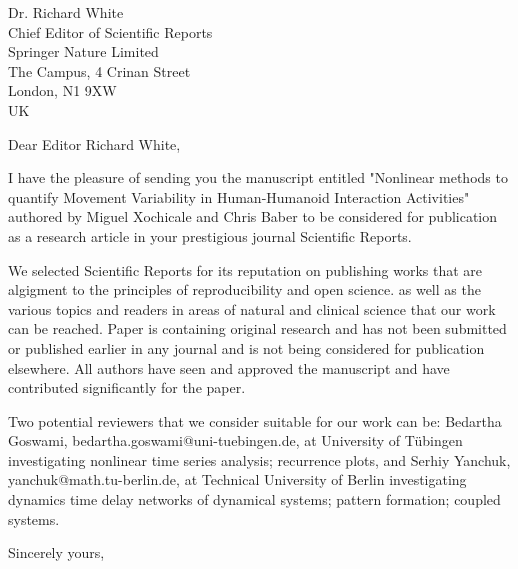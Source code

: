 \documentclass[10pt]{letter}
\begin{document}
\begin{letter}{Dr. Richard White \\
Chief Editor of Scientific Reports \\
Springer Nature Limited \\
The Campus, 4 Crinan Street\\
London, N1 9XW \\
UK
}
\opening{Dear Editor Richard White,}

I have the pleasure of sending you the manuscript entitled 
"Nonlinear methods to quantify Movement Variability in Human-Humanoid Interaction Activities"
authored by Miguel Xochicale and Chris Baber to be considered for publication as a research article 
in your prestigious journal Scientific Reports.

We selected Scientific Reports for 
its reputation on publishing works that are algigment to the principles of reproducibility and open science. 
as well as the various topics and readers in areas of natural and clinical science that our work can be reached. 
Paper is containing original research and has not been submitted or published earlier 
in any journal and is not being considered for publication elsewhere. 
All authors have seen and approved the manuscript and have contributed significantly for the paper.

Two potential reviewers that we consider suitable for our work can be:
Bedartha Goswami, bedartha.goswami@uni-tuebingen.de,
at University of Tübingen investigating nonlinear time series analysis; recurrence plots, and
Serhiy Yanchuk, yanchuk@math.tu-berlin.de, at Technical University of Berlin investigating 
dynamics time delay networks of dynamical systems; pattern formation; coupled systems.



\closing{Sincerely yours,}


\end{letter}
\end{document}
